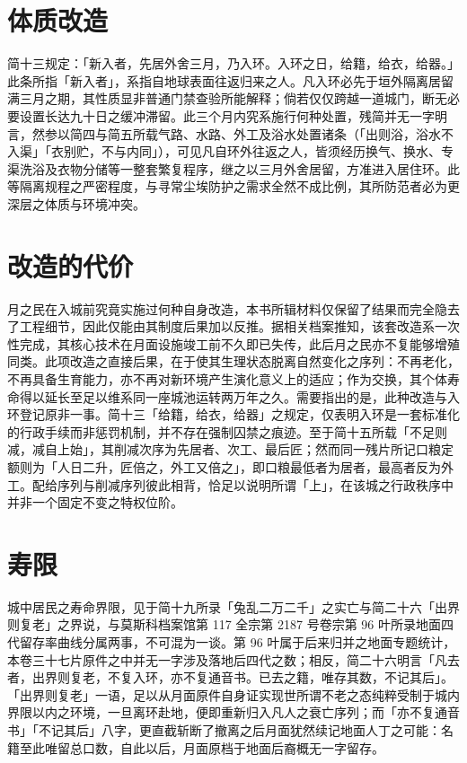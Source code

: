 \section{体质改造}

简十三规定：「新入者，先居外舍三月，乃入环。入环之日，给籍，给衣，给器。」此条所指「新入者」，系指自地球表面往返归来之人。凡入环必先于垣外隔离居留满三月之期，其性质显非普通门禁查验所能解释；倘若仅仅跨越一道城门，断无必要设置长达九十日之缓冲滞留。此三个月内究系施行何种处置，残简并无一字明言，然参以简四与简五所载气路、水路、外工及浴水处置诸条（「出则浴，浴水不入渠」「衣别贮，不与内同」），可见凡自环外往返之人，皆须经历换气、换水、专渠洗浴及衣物分储等一整套繁复程序，继之以三月外舍居留，方准进入居住环。此等隔离规程之严密程度，与寻常尘埃防护之需求全然不成比例，其所防范者必为更深层之体质与环境冲突。

\section{改造的代价}

月之民在入城前究竟实施过何种自身改造，本书所辑材料仅保留了结果而完全隐去了工程细节，因此仅能由其制度后果加以反推。据相关档案推知，该套改造系一次性完成，其核心技术在月面设施竣工前不久即已失传，此后月之民亦不复能够增殖同类。此项改造之直接后果，在于使其生理状态脱离自然变化之序列：不再老化，不再具备生育能力，亦不再对新环境产生演化意义上的适应；作为交换，其个体寿命得以延长至足以维系同一座城池运转两万年之久。需要指出的是，此种改造与入环登记原非一事。简十三「给籍，给衣，给器」之规定，仅表明入环是一套标准化的行政手续而非惩罚机制，并不存在强制囚禁之痕迹。至于简十五所载「不足则减，减自上始」，其削减次序为先居者、次工、最后匠；然而同一残片所记口粮定额则为「人日二升，匠倍之，外工又倍之」，即口粮最低者为居者，最高者反为外工。配给序列与削减序列彼此相背，恰足以说明所谓「上」，在该城之行政秩序中并非一个固定不变之特权位阶。

\section{寿限}

城中居民之寿命界限，见于简十九所录「兔乱二万二千」之实亡与简二十六「出界则复老」之界说，与莫斯科档案馆第 117 全宗第 2187 号卷宗第 96 叶所录地面四代留存率曲线分属两事，不可混为一谈。第 96 叶属于后来归并之地面专题统计，本卷三十七片原件之中并无一字涉及落地后四代之数；相反，简二十六明言「凡去者，出界则复老，不复入环，亦不复通音书。已去之籍，唯存其数，不记其后」。「出界则复老」一语，足以从月面原件自身证实现世所谓不老之态纯粹受制于城内界限以内之环境，一旦离环赴地，便即重新归入凡人之衰亡序列；而「亦不复通音书」「不记其后」八字，更直截斩断了撤离之后月面犹然续记地面人丁之可能：名籍至此唯留总口数，自此以后，月面原档于地面后裔概无一字留存。


